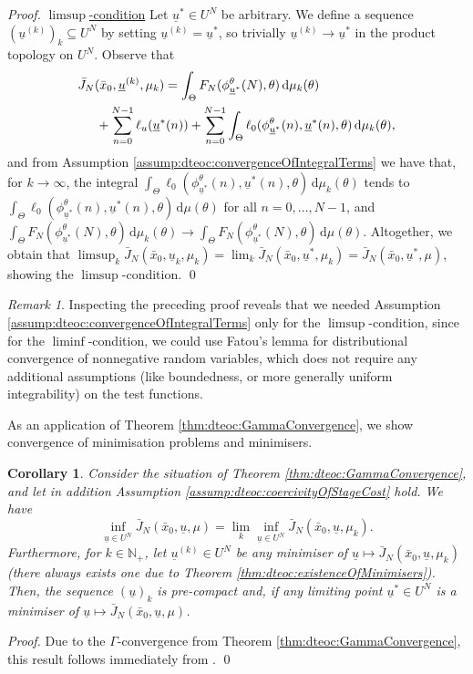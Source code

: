 \documentclass[letterpaper, 10 pt, conference]{IEEEconf}  %
\newcommand{\Np}{\mathbb{N}_+} %
\newcommand{\diff}{\, \mathrm{d}} %
\newcommand{\s}{\phi} %
\newcommand{\es}{\bar{x}} %
\newcommand{\is}[1]{{\underline{#1}}} %
\theoremstyle{theorem}
\newtheorem{corollary}[theorem]{Corollary}
\theoremstyle{definition}
\theoremstyle{remark}
\newtheorem{remark}{Remark}
\begin{document}
\begin{proof}
\underline{$\limsup$-condition} Let $\is{u}^\ast \in U^N$ be arbitrary. We define a sequence $(\is{u}^{(k)})_k\subseteq U^N$ by setting $\is{u}^{(k)}=\is{u}^\ast$, so trivially $\is{u}^{(k)}\rightarrow \is{u}^\ast$ in the product topology on $U^N$.
Observe that
\begin{align*}
    & \bar J_N(\es_0,\is{u}^{(k)},\mu_k) = \int_\Theta F_N(\s_{\is{u}^\ast}^\theta(N),\theta) \diff \mu_k(\theta) \\
        & \hspace{0.5cm}   + \sum_{n=0}^{N-1} \ell_u(\is{u}^\ast(n)) + \sum_{n=0}^{N-1} \int_\Theta \ell_0(\s_{\is{u}^\ast}^\theta(n),\is{u}^\ast(n),\theta) \diff \mu_k(\theta),
\end{align*}
and from Assumption \ref{assump:dteoc:convergenceOfIntegralTerms} we have that, for $k\to \infty$, the integral
$\int_\Theta \ell_0(\s_{\is{u}^\ast}^\theta(n),\is{u}^\ast(n),\theta)  \diff \mu_k(\theta)$ tends to $  \int_\Theta \ell_0(\s_{\is{u}^\ast}^\theta(n),\is{u}^\ast(n),\theta)  \diff \mu(\theta)$ for all $n=0,\ldots,N-1$,
and $\int_\Theta F_N(\s_{\is{u}^\ast}^\theta(N),\theta) \diff \mu_k(\theta)
    \to 
    \int_\Theta F_N(\s_{\is{u}^\ast}^\theta(N),\theta) \diff \mu(\theta)$.
Altogether, we obtain that $\limsup_k \bar J_N(\es_0,\is{u}_k,\mu_k) = \lim_k \bar J_N(\es_0,\is{u}^\ast,\mu_k) = \bar J_N(\es_0,\is{u}^\ast,\mu)$,
showing the $\limsup$-condition. \qed
\end{proof}
\begin{remark}
Inspecting the preceding proof reveals that we needed Assumption \ref{assump:dteoc:convergenceOfIntegralTerms} only for the $\limsup$-condition,
since for the $\liminf$-condition, we could use Fatou's lemma for distributional convergence of nonnegative random variables, which does not require any additional assumptions (like boundedness, or more generally uniform integrability) on the test functions.
\end{remark}
As an application of Theorem \ref{thm:dteoc:GammaConvergence}, we show convergence of minimisation problems and minimisers.
\begin{corollary} \label{cor:ecc:convOfMin}
Consider the situation of Theorem \ref{thm:dteoc:GammaConvergence}, and let in addition Assumption \ref{assump:dteoc:coercivityOfStageCost} hold.
We have
\begin{equation}
    \inf_{\is{u} \in U^N} \bar J_N(\es_0,\is{u},\mu) = \lim_k \inf_{\is{u} \in U^N} \bar J_N(\es_0, \is{u}, \mu_k).
\end{equation}
Furthermore, for $k\in\Np$, let $\is{u}^{(k)} \in U^N$ be any minimiser of $\is{u} \mapsto \bar J_N(\es_0,\is{u},\mu_k)$ (there always exists one due to Theorem \ref{thm:dteoc:existenceOfMinimisers}).
Then, the sequence $(\is{u})_k$ is pre-compact and, if any limiting point $\is{u}^\ast\in U^N$ is a minimiser of $\is{u}\mapsto \bar J_N(\es_0,\is{u},\mu)$.
\end{corollary}
\begin{proof}
Due to the $\Gamma$-convergence from Theorem \ref{thm:dteoc:GammaConvergence}, this result follows immediately from \cite[Corollary~7.20]{dalmaso1993introduction}. \qed
\end{proof}
\end{document}
